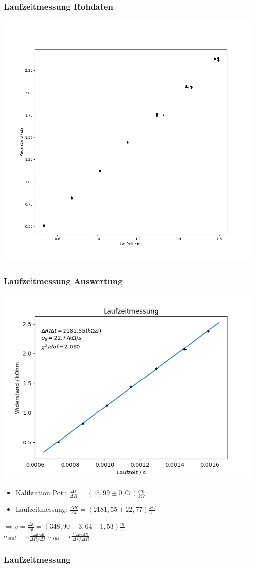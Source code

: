 \documentclass[11pt]{beamer}
\begin{document}
	\begin{frame}
		\frametitle{Laufzeitmessung \qquad Rohdaten}
		\begin{center}
			\includegraphics[width=0.8\linewidth]{rohdaten_laufzeit}
		\end{center}
	\end{frame}

	\begin{frame}
		\frametitle{Laufzeitmessung \qquad Auswertung}
		\begin{center}
			\includegraphics[width=0.6\linewidth]{fit_laufzeit}
		\end{center}
		\begin{itemize}
			\item Kalibration Poti: $\frac{\Delta s}{\Delta R} = (15,99 \pm 0,07) \frac{cm}{k\Omega}$\\ [0.3cm]
			\item Laufzeitmessung: $\frac{\Delta R}{\Delta t} = (2181,55 \pm 22,77) \frac{k\Omega}{s}$
		\end{itemize}
		$\Rightarrow v = \frac{\Delta s}{\Delta t} = (348,90 \pm 3,64 \pm 1,53) \frac{m}{s}$ \\ [0.3cm]
		\qquad $\sigma _{stat} = v \frac{\sigma _{\Delta R/\Delta t}}{\Delta R / \Delta t}$ \qquad $\sigma _{sys} = v \frac{\sigma _{\Delta s/\Delta R}}{\Delta s / \Delta R}$
	\end{frame}

	\begin{frame}
		\frametitle{Laufzeitmessung \qquad}
	\end{frame}
\end{document}
